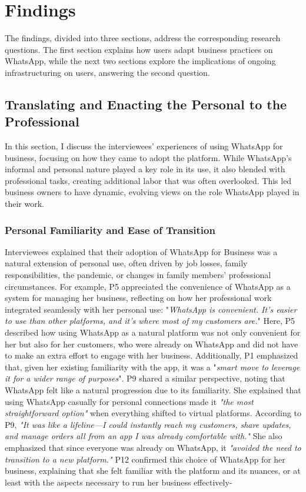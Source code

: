 \section{Findings}

The findings, divided into three sections, address the corresponding research questions. The first section explains how users adapt business practices on WhatsApp, while the next two sections explore the implications of ongoing infrastructuring on users, answering the second question.

\subsection{Translating and Enacting the Personal to the Professional}

In this section, I discuss the interviewees' experiences of using WhatsApp for business, focusing on how they came to adopt the platform. While WhatsApp’s informal and personal nature played a key role in its use, it also blended with professional tasks, creating additional labor that was often overlooked. This led business owners to have dynamic, evolving views on the role WhatsApp played in their work.


\subsubsection{Personal Familiarity and Ease of Transition}

Interviewees explained that their adoption of WhatsApp for Business was a natural extension of personal use, often driven by job losses, family responsibilities, the pandemic, or changes in family members' professional circumstances. For example, P5 appreciated the convenience of WhatsApp as a system for managing her business, reflecting on how her professional work integrated seamlessly with her personal use: "\textit{WhatsApp is convenient. It’s easier to use than other platforms, and it’s where most of my customers are.}" Here, P5 described how using WhatsApp as a natural platform was not only convenient for her but also for her customers, who were already on WhatsApp and did not have to make an extra effort to engage with her business. Additionally, P1 emphasized that, given her existing familiarity with the app, it was a "\textit{smart move to leverage it for a wider range of purposes}". P9 shared a similar perspective, noting that WhatsApp felt like a natural progression due to its familiarity. She explained that using WhatsApp casually for personal connections made it \textit{"the most straightforward option"} when everything shifted to virtual platforms. According to P9, \textit{"It was like a lifeline—I could instantly reach my customers, share updates, and manage orders all from an app I was already comfortable with."} She also emphasized that since everyone was already on WhatsApp, it \textit{"avoided the need to transition to a new platform."} P12 confirmed this choice of WhatsApp for her business, explaining that she felt familiar with the platform and its nuances, or at least with the aspects necessary to run her business effectively-

